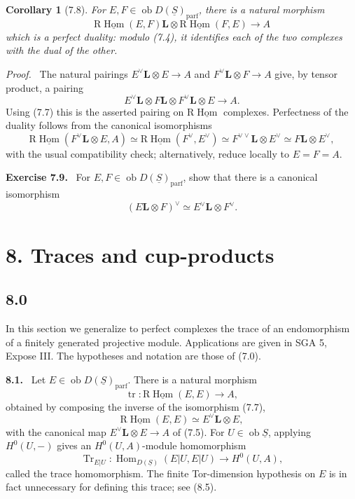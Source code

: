 \documentclass[13pt]{extarticle}
\newcommand{\uS}{\underline S}
\newcommand{\Tr}{\operatorname{Tr}}
\newcommand{\tr}{\operatorname{tr}}
\newcommand{\ob}{\operatorname{ob}}
\newcommand{\Hom}{\operatorname{Hom}}
\newcommand{\RHom}{\mathrm R\underline{\operatorname{Hom}}}
\newcommand{\bbL}{\mathbin{\mathbf L\!\otimes}}
\newenvironment{statement}[1]{\par\medskip\noindent\textbf{#1.}\ }{\par\medskip}
\newenvironment{prooftext}[1][Proof]{\par\noindent\emph{#1.}\ }{\par\medskip}
\newtheorem*{corollary*}{Corollary}
\begin{document}
\begin{corollary*}[7.8]
For $E,F\in\ob D(\uS)_{\mathrm{parf}}$, there is a natural morphism
\[
\RHom(E,F)\bbL\RHom(F,E)\longrightarrow A
\]
which is a perfect duality: modulo (7.4), it identifies each of the two complexes with the dual of the other.
\end{corollary*}

\begin{prooftext}
The natural pairings $E^\vee\bbL E\to A$ and $F^\vee\bbL F\to A$ give, by tensor product, a pairing
\[
E^\vee\bbL F\bbL F^\vee\bbL E\longrightarrow A.
\]
Using (7.7) this is the asserted pairing on $\RHom$ complexes. Perfectness of the duality follows from the canonical isomorphisms
\[
\RHom(F^\vee\bbL E,A)
\simeq\RHom(F^\vee,E^\vee)
\simeq F^{\vee\vee}\bbL E^\vee
\simeq F\bbL E^\vee,
\]
with the usual compatibility check; alternatively, reduce locally to $E=F=A$.
\end{prooftext}

\begin{statement}{Exercise 7.9}
For $E,F\in\ob D(\uS)_{\mathrm{parf}}$, show that there is a canonical isomorphism
\[
(E\bbL F)^\vee\simeq E^\vee\bbL F^\vee.
\]
\end{statement}

\section*{8. Traces and cup-products}

\subsection*{8.0}
In this section we generalize to perfect complexes the trace of an endomorphism of a finitely generated projective module. Applications are given in SGA 5, Expose III. The hypotheses and notation are those of (7.0).

\begin{statement}{8.1}
Let $E\in\ob D(\uS)_{\mathrm{parf}}$. There is a natural morphism
\[
\tr:\RHom(E,E)\longrightarrow A,
\]
obtained by composing the inverse of the isomorphism (7.7),
\[
\RHom(E,E)\simeq E^\vee\bbL E,
\]
with the canonical map $E^\vee\bbL E\to A$ of (7.5). For $U\in\ob\uS$, applying $H^0(U,-)$ gives an $H^0(U,A)$-module homomorphism
\[
\Tr_{E|U}:\Hom_{D(\uS)}(E|U,E|U)\longrightarrow H^0(U,A),
\]
called the trace homomorphism. The finite Tor-dimension hypothesis on $E$ is in fact unnecessary for defining this trace; see (8.5).
\end{statement}
\end{document}
